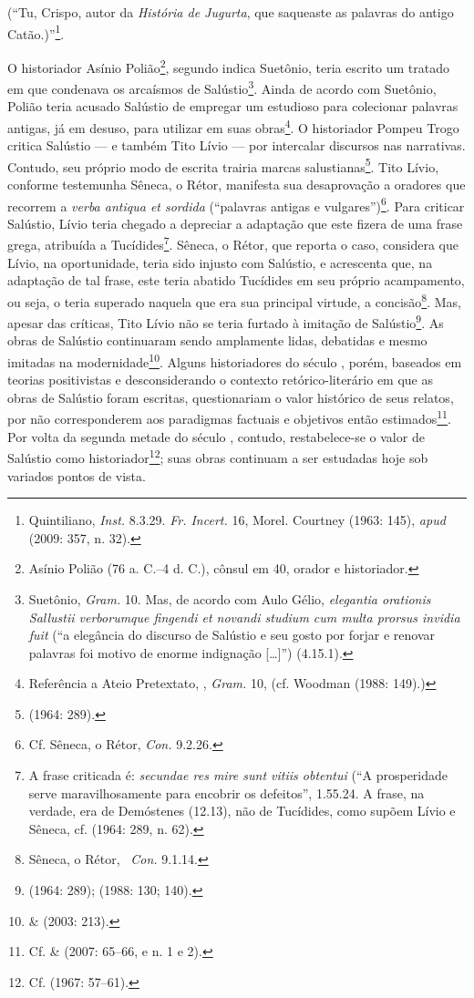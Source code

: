 (“Tu, Crispo,
autor da \emph{História de Jugurta}, que saqueaste as palavras do antigo
Catão.)”\footnote{Quintiliano, \emph{Inst.} 8.3.29. \emph{Fr. Incert.} 16, Morel. Courtney
(1963: 145), \emph{apud } (2009: 357, n. 32).}.

O historiador Asínio Polião\footnote{Asínio Polião (76 a. C.--4 d. C.), cônsul
em 40, orador e historiador.}, segundo indica Suetônio, teria escrito um
tratado em que condenava os arcaísmos de Salústio\footnote{Suetônio, \emph{Gram.} 10. Mas, de acordo com Aulo Gélio,  \emph{elegantia orationis
Sallustii verborumque fingendi et novandi studium cum multa prorsus invidia
fuit} (“a elegância do discurso de Salústio e seu gosto por forjar e renovar
palavras foi motivo de enorme indignação [\ldots{}]”) (4.15.1).}. Ainda de acordo com Suetônio, Polião teria acusado Salústio de empregar
um estudioso para colecionar palavras antigas, já em desuso, para utilizar em
suas obras\footnote{ Referência a Ateio Pretextato, , \emph{Gram.} 10, (cf. Woodman (1988: 149).)}.  O historiador Pompeu Trogo critica Salústio ---
e também Tito Lívio --- por intercalar discursos nas narrativas. Contudo, seu
próprio modo de escrita trairia marcas salustianas\footnote{ (1964: 289).}. Tito Lívio, conforme testemunha Sêneca, o Rétor, manifesta sua
desaprovação a oradores que recorrem a \emph{verba antiqua et sordida}
(``palavras antigas e vulgares'')\footnote{ Cf. Sêneca, o Rétor, \emph{Con.}
9.2.26.}. Para criticar Salústio, Lívio teria chegado a depreciar a adaptação
que este fizera de uma frase grega, atribuída a Tucídides\footnote{A frase
criticada é: \emph{secundae res mire sunt vitiis obtentui} (“A prosperidade
serve maravilhosamente para encobrir os defeitos”, 1.55.24.
A frase, na verdade, era de Demóstenes  (12.13), não de Tucídides, como supõem
Lívio e Sêneca, cf.  (1964: 289, n. 62).}.  Sêneca, o Rétor, que reporta
o caso, considera que Lívio, na oportunidade, teria sido injusto com Salústio,
e acrescenta que, na adaptação de tal frase, este teria abatido Tucídides em
seu próprio acampamento, ou seja, o teria superado naquela que era sua
principal virtude, a concisão\footnote{Sêneca, o Rétor,  \emph{Con.} 9.1.14.}. Mas, apesar das críticas, Tito Lívio não se teria furtado à imitação de
Salústio\footnote{ (1964: 289);  (1988: 130; 140).}.  As
obras de Salústio continuaram sendo amplamente lidas, debatidas e mesmo
imitadas na modernidade\footnote{  \&  (2003: 213).}. Alguns
historiadores do século , porém, baseados em teorias positivistas e
desconsiderando o contexto retórico-literário em que as obras de Salústio foram
escritas, questionariam o valor histórico de seus relatos, por não
corresponderem aos paradigmas factuais e objetivos então estimados\footnote{Cf.  \&  (2007: 65--66, e n. 1 e 2).}.  Por volta da segunda
  metade do século , contudo, restabelece-se o valor de Salústio
  como historiador\footnote{Cf.  (1967: 57--61).}; suas obras
  continuam a ser estudadas hoje sob variados pontos de vista.


